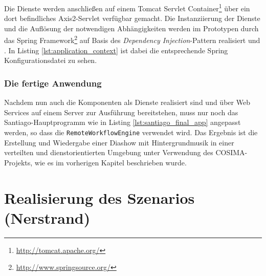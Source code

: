   

  Die Dienste werden anschließen auf einem Tomcat Servlet Container\footnote{\url{http://tomcat.apache.org/}} über ein dort befindliches Axis2-Servlet verfügbar gemacht. Die Instanziierung der Dienste und die Auflösung der notwendigen Abhängigkeiten werden im Prototypen durch das Spring Framework\footnote{\url{http://www.springsource.org/}} auf Basis des \emph{Dependency Injection}-Pattern realisiert \citep[S. 130]{johnson2004eoo} und \citep{fowler04di}. In Listing \ref{lst:application_context} ist dabei die entsprechende Spring Konfigurationsdatei zu sehen.

  
  

\subsubsection{Die fertige Anwendung} %
\label{ssub:die_fertige_anwendung}

  Nachdem nun auch die Komponenten als Dienste realisiert sind und über Web Services auf einem Server zur Ausführung bereitstehen, muss nur noch das Santiago-Hauptprogramm wie in Listing \ref{lst:santiago_final_app} angepasst werden, so dass die \verb!RemoteWorkflowEngine! verwendet wird. Das Ergebnis ist die Erstellung und Wiedergabe einer Diashow mit Hintergrundmusik in einer verteilten und dienstorientierten Umgebung unter Verwendung des COSIMA-Projekts, wie es im vorherigen Kapitel beschrieben wurde.

  
  

  

\section{Realisierung des Szenarios (Nerstrand)} %
\label{sec:realisierung_des_szenario}

